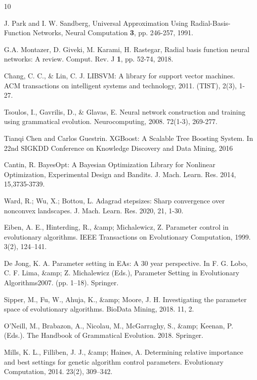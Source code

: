\documentclass[12pt]{Definitions/academia}
\begin{document}
\begin{thebibliography}{10}
{{
J. Park and I. W. Sandberg, Universal Approximation
Using Radial-Basis-Function Networks, Neural Computation \textbf{3},
pp. 246-257, 1991.

G.A. Montazer, D. Giveki, M. Karami,
H. Rastegar, Radial basis function neural networks: A review. Comput.
Rev. J \textbf{1}, pp. 52-74, 2018.

Chang, C. C., \& Lin, C. J. LIBSVM: A library
for support vector machines. ACM transactions on intelligent systems
and technology, 2011. (TIST), 2(3), 1-27.

Tsoulos, I., Gavrilis, D., \& Glavas, E. Neural
network construction and training using grammatical evolution. Neurocomputing,
2008. 72(1-3), 269-277.

Tianqi Chen and Carlos Guestrin. XGBoost: A Scalable Tree Boosting System. In 22nd SIGKDD Conference on Knowledge Discovery and Data Mining, 2016

Cantin, R. BayesOpt: A Bayesian Optimization Library for Nonlinear Optimization, Experimental Design and Bandits. J. Mach. Learn. Res. 2014, 15,3735-3739.



Ward, R.; Wu, X.; Bottou, L. Adagrad stepsizes: Sharp convergence over nonconvex landscapes. J. Mach. Learn. Res. 2020, 21, 1-30.

Eiben, A. E., Hinterding, R., \&amp; Michalewicz,
Z. Parameter control in evolutionary algorithms. IEEE Transactions
on Evolutionary Computation, 1999. 3(2), 124--141.

De Jong, K. A. Parameter setting in EAs: A
30 year perspective. In F. G. Lobo, C. F. Lima, \&amp; Z. Michalewicz
(Eds.), Parameter Setting in Evolutionary Algorithms2007. (pp. 1--18).
Springer.

Sipper, M., Fu, W., Ahuja, K., \&amp; Moore,
J. H. Investigating the parameter space of evolutionary algorithms.
BioData Mining, 2018. 11, 2.

O\textquoteright Neill, M., Brabazon,
A., Nicolau, M., McGarraghy, S., \&amp; Keenan, P. (Eds.). The Handbook
of Grammatical Evolution. 2018. Springer.

Mills, K. L., Filliben, J. J., \&amp; Haines,
A. Determining relative importance and best settings for genetic algorithm
control parameters. Evolutionary Computation, 2014. 23(2), 309--342.

}}\end{thebibliography}
\end{document}
